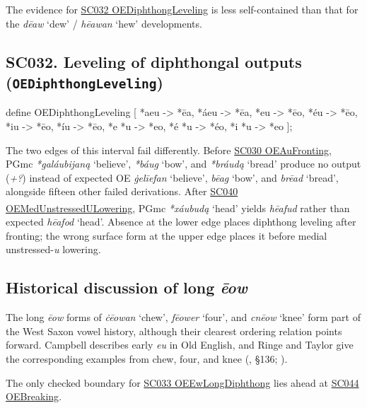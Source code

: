 \documentclass[
  british,
  a4paper,
  openany]{book}
\providecommand{\Pred}[1]{\textsuperscript{\dag}\emph{#1}}
\providecommand{\Recon}[1]{\emph{*#1}}
{\catcode`→=\active \global\def→{\ensuremath{\rightarrow}}}
\providecommand{\texorpdfstring}[2]{#1}
\providecommand{\Pred}[1]{\textsuperscript{\dag}\emph{#1}}
\providecommand{\Recon}[1]{\emph{*#1}}
{\catcode`→=\active \global\def→{\ensuremath{\rightarrow}}}
\begin{document}
The evidence for \hyperref[rule-OEDiphthongLeveling]{SC032
OEDiphthongLeveling} is less self-contained than that for the
\emph{dēaw} `dew' / \emph{hēawan} `hew' developments.

\subsection{\texorpdfstring{SC032. Leveling of diphthongal outputs
(\texttt{OEDiphthongLeveling})}{SC032. Leveling of diphthongal outputs (OEDiphthongLeveling)}}\label{rule-OEDiphthongLeveling}

\begin{ReaderFacingFoma}
define OEDiphthongLeveling [
    {*aeu} -> {*ēa},
    {*áeu} -> {*ēa},
    {*eu} -> {*ēo},
    {*éu} -> {*ēo},
    {*iu} -> {*ēo},
    {*íu} -> {*ēo},
    {*e} {*u} -> {*eo},
    {*é} {*u} -> {*éo},
    {*i} {*u} -> {*eo}
];
\end{ReaderFacingFoma}

The two edges of this interval fail differently. Before
\hyperref[rule-OEAuFronting]{SC030 OEAuFronting}, PGmc
\Recon{galáubijaną} `believe', \Recon{báug} `bow', and \Recon{bráudą}
`bread' produce no output (\emph{+?}) instead of expected OE
\emph{ġelīefan} `believe', \emph{bēag} `bow', and \emph{brēad} `bread',
alongside fifteen other failed derivations. After
\hyperref[rule-OEMedUnstressedULowering]{SC040
OEMedUnstressedULowering}, PGmc \Recon{xáubudą} `head' yields
\Pred{hēafud} rather than expected \emph{hēafod} `head'. Absence at the
lower edge places diphthong leveling after fronting; the wrong surface
form at the upper edge places it before medial unstressed-\emph{u}
lowering.

\subsection{\texorpdfstring{Historical discussion of long
\emph{ēow}}{Historical discussion of long }}\label{historical-discussion-of-long}

The long \emph{ēow} forms of \emph{ċēowan} `chew', \emph{fēower} `four',
and \emph{cnēow} `knee' form part of the West Saxon vowel history,
although their clearest ordering relation points forward. Campbell
describes early \emph{eu} in Old English, and Ringe and Taylor give the
corresponding examples from chew, four, and knee
(, §136;
).

The only checked boundary for \hyperref[rule-OEEwLongDiphthong]{SC033
OEEwLongDiphthong} lies ahead at \hyperref[rule-OEBreaking]{SC044
OEBreaking}.
\end{document}
